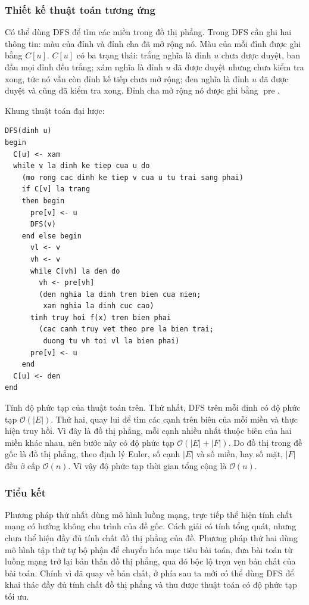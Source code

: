 \documentclass[11pt]{article}
\newcommand{\Oh}{\mathcal{O}}
\begin{document}
\subsubsection{Thiết kế thuật toán tương ứng}

Có thể dùng DFS để tìm các miền trong đồ thị phẳng. Trong DFS cần ghi hai
thông tin: màu của đỉnh và đỉnh cha đã mở rộng nó. Màu của mỗi đỉnh được ghi
bằng \(C[u]\). \(C[u]\) có ba trạng thái: trắng nghĩa là đỉnh \(u\) chưa được
duyệt, ban đầu mọi đỉnh đều trắng; xám nghĩa là đỉnh \(u\) đã được duyệt nhưng
chưa kiểm tra xong, tức nó vẫn còn đỉnh kế tiếp chưa mở rộng; đen nghĩa là
đỉnh \(u\) đã được duyệt và cũng đã kiểm tra xong. Đỉnh cha mở rộng nó được ghi
bằng \(\operatorname{pre}\).

Khung thuật toán đại lược:
\begin{verbatim}
DFS(dinh u)
begin
  C[u] <- xam
  while v la dinh ke tiep cua u do
    (mo rong cac dinh ke tiep v cua u tu trai sang phai)
    if C[v] la trang
    then begin
      pre[v] <- u
      DFS(v)
    end else begin
      vl <- v
      vh <- v
      while C[vh] la den do
        vh <- pre[vh]
        (den nghia la dinh tren bien cua mien;
         xam nghia la dinh cuc cao)
      tinh truy hoi f(x) tren bien phai
        (cac canh truy vet theo pre la bien trai;
         duong tu vh toi vl la bien phai)
      pre[v] <- u
    end
  C[u] <- den
end
\end{verbatim}

Tính độ phức tạp của thuật toán trên. Thứ nhất, DFS trên mỗi đỉnh có độ phức
tạp \(\Oh(|E|)\). Thứ hai, quay lui để tìm các cạnh trên biên của mỗi miền và
thực hiện truy hồi. Vì đây là đồ thị phẳng, mỗi cạnh nhiều nhất thuộc biên của
hai miền khác nhau, nên bước này có độ phức tạp \(\Oh(|E|+|F|)\). Do đồ thị
trong đề gốc là đồ thị phẳng, theo định lý Euler, số cạnh \(|E|\) và số miền,
hay số mặt, \(|F|\) đều ở cấp \(\Oh(n)\). Vì vậy độ phức tạp thời gian tổng
cộng là \(\Oh(n)\).

\subsubsection{Tiểu kết}

Phương pháp thứ nhất dùng mô hình luồng mạng, trực tiếp thể hiện tính chất
mạng có hướng không chu trình của đề gốc. Cách giải có tính tổng quát, nhưng
chưa thể hiện đầy đủ tính chất đồ thị phẳng của đề. Phương pháp thứ hai dùng
mô hình tập thứ tự bộ phận để chuyển hóa mục tiêu bài toán, đưa bài toán từ
luồng mạng trở lại bản thân đồ thị phẳng, qua đó bộc lộ trọn vẹn bản chất của
bài toán. Chính vì đã quay về bản chất, ở phía sau ta mới có thể dùng DFS để
khai thác đầy đủ tính chất đồ thị phẳng và thu được thuật toán có độ phức tạp
tối ưu.
\end{document}
